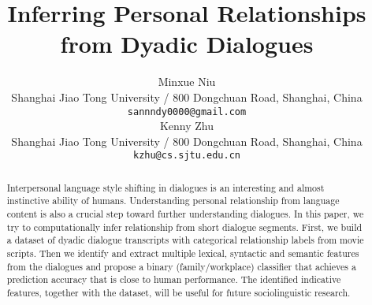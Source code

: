 \documentclass[11pt,a4paper]{article}
\title{Inferring Personal Relationships from Dyadic Dialogues}
\author{Minxue Niu \\
  Shanghai Jiao Tong University / 800 Dongchuan Road, Shanghai, China \\
  {\tt sannndy0000@gmail.com} \\\And
  Kenny Zhu \\
  Shanghai Jiao Tong University / 800 Dongchuan Road, Shanghai, China \\
  {\tt kzhu@cs.sjtu.edu.cn} \\}
\date{}
\begin{document}
\maketitle
\begin{abstract}
  Interpersonal language style shifting in dialogues is an interesting and almost 
  instinctive ability of humans. Understanding personal relationship from language content is also 
  a crucial step toward further understanding dialogues. In this paper, we try to 
  computationally infer relationship from short dialogue segments. First, we build 
  a dataset of dyadic dialogue transcripts with categorical relationship labels 
  from movie scripts. 
  Then we identify and extract multiple lexical, syntactic and 
  semantic features from the dialogues and propose a binary
  (family/workplace) classifier that achieves a prediction
  accuracy that is close to human performance. The identified indicative features,
  together with the dataset, will be useful for future sociolinguistic research.
\end{abstract}


















\end{document}
